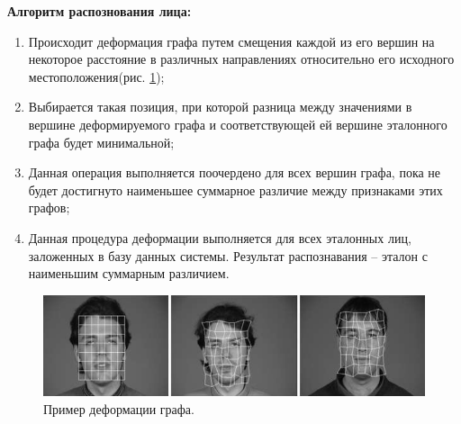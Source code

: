 \textbf{Алгоритм распознования лица:}
\begin{enumerate}
    \item Происходит деформация графа путем смещения каждой из его вершин на некоторое расстояние
    в различных направлениях относительно его исходного местоположения(рис. \ref{img:demonstration});
    \item Выбирается такая позиция, при которой разница между значениями в вершине деформируемого графа и 
    соответствующей ей вершине эталонного графа будет минимальной;
    \item Данная операция выполняется поочердено для всех вершин графа, пока не будет достигнуто наименьшее суммарное различие 
    между признаками этих графов;
    \item  Данная процедура деформации выполняется для всех эталонных лиц, заложенных в базу данных системы. 
    Результат распознавания -- эталон с наименьшим суммарным различием.
\end{enumerate}

\begin{figure}[h]
    \centering
    \includegraphics[height=0.15\textheight]{img/img_a.jpg}
    \caption{Пример деформации графа.}
    \label{img:demonstration}
\end{figure}
    
